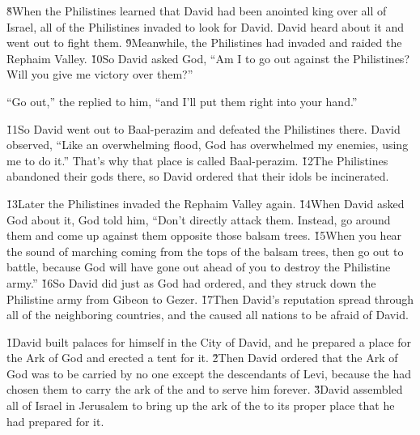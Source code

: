 \v{8}When the Philistines learned that David had been anointed king over all of Israel, all of the Philistines invaded to look for David. David heard about it and went out to fight them. \v{9}Meanwhile, the Philistines had invaded and raided the Rephaim Valley. \v{10}So David asked God, ``Am I to go out against the Philistines? Will you give me victory over them?''

``Go out,'' the  replied to him, ``and I'll put them right into your hand.''

\v{11}So David went out to Baal-perazim and defeated the Philistines there. David observed, ``Like an overwhelming flood, God has overwhelmed my enemies, using me to do it.'' That's why that place is called Baal-perazim. \v{12}The Philistines abandoned their gods there, so David ordered that their idols be incinerated.

\v{13}Later the Philistines invaded the Rephaim Valley again. \v{14}When David asked God about it, God told him, ``Don't directly attack them. Instead, go around them and come up against them opposite those balsam trees. \v{15}When you hear the sound of marching coming from the tops of the balsam trees, then go out to battle, because God will have gone out ahead of you to destroy the Philistine army.'' \v{16}So David did just as God had ordered, and they struck down the Philistine army from Gibeon to Gezer. \v{17}Then David's reputation spread through all of the neighboring countries, and the  caused all nations to be afraid of David.

\v{1}David built palaces for himself in the City of David, and he prepared a place for the Ark of God and erected a tent for it. \v{2}Then David ordered that the Ark of God was to be carried by no one except the descendants of Levi, because the  had chosen them to carry the ark of the  and to serve him forever. \v{3}David assembled all of Israel in Jerusalem to bring up the ark of the  to its proper place that he had prepared for it.

